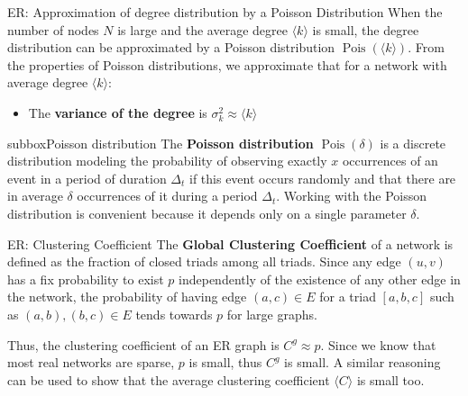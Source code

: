 \documentclass[a4paper,11pt]{book}
\begin{document}
\begin{textbox}{ER: Approximation of degree distribution by a Poisson Distribution}
When the number of nodes $N$ is large and the average degree $\langle k \rangle$ is small, the degree distribution can be approximated by a Poisson distribution $\operatorname {Pois}(\langle k \rangle)$. From the properties of Poisson distributions, we approximate that for a network with average degree $\langle k \rangle$:
\begin{itemize}
    \item The \textbf{variance of the degree} is $\sigma_k^2 \approx{\langle k \rangle}$
\end{itemize}

\end{textbox}


\begin{subbox}{subbox}{Poisson distribution}
  The \textbf{Poisson distribution} $\operatorname {Pois}(\delta)$ is a discrete distribution modeling the probability of observing exactly $x$ occurrences of an event in a period of duration $\Delta_t$ if this event occurs randomly and that there are in average $\delta$ occurrences of it during a period $\Delta_t$. Working with the Poisson distribution is convenient because it depends only on a single parameter $\delta$. %
\end{subbox}













\begin{textbox}{ER: Clustering Coefficient}
The \textbf{Global Clustering Coefficient} of a network is defined as the fraction of closed triads among all triads. Since any edge $(u,v)$ has a fix probability to exist $p$ independently of the existence of any other edge in the network, the probability of having edge $(a,c) \in E$ for a triad $[a,b,c]$ such as $(a,b),(b,c) \in E$ tends towards $p$ for large graphs. 

Thus, the clustering coefficient of an ER graph is $C^g\approx p$. Since we know that most real networks are sparse, $p$ is small, thus $C^g$ is small. A similar reasoning can be used to show that the average clustering coefficient $\langle C \rangle$ is small too.  

\end{textbox}
\end{document}
